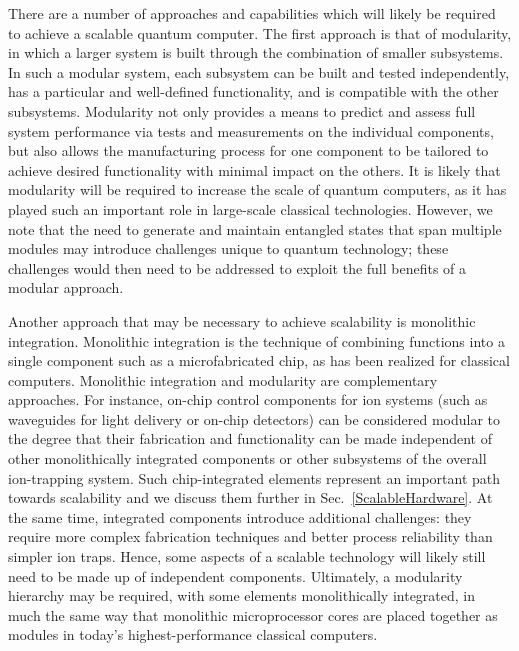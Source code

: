 \documentclass[%
12pt,
 amsmath,amssymb,
]{revtex4-2}
\begin{document}
There are a number of approaches and capabilities which will likely be required to achieve a scalable quantum computer.  The first approach is that of modularity, in which a larger system is built through the combination of smaller subsystems.  In such a modular system, each subsystem can be built and tested independently, has a particular and well-defined functionality, and is compatible with the other subsystems. Modularity not only provides a means to predict and assess full system performance via tests and measurements on the individual components, but also allows the manufacturing process for one component to be tailored to achieve desired functionality with minimal impact on the others.  It is likely that modularity will be required to increase the scale of quantum computers, as it has played such an important role in large-scale classical technologies.  However, we note that the need to generate and maintain entangled states that span multiple modules may introduce challenges unique to quantum technology; these challenges would then need to be addressed to exploit the full benefits of a modular approach.

Another approach that may be necessary to achieve scalability is monolithic integration.  Monolithic integration is the technique of combining functions into a single component such as a microfabricated chip, as has been realized for classical computers.  Monolithic integration and modularity are complementary approaches.  For instance, on-chip control components for ion systems (such as waveguides for light delivery or on-chip detectors) can be considered modular to the degree that their fabrication and functionality can be made independent of other monolithically integrated components or other subsystems of the overall ion-trapping system. Such chip-integrated elements represent an important path towards scalability and we discuss them further in Sec.~\ref{ScalableHardware}. At the same time, integrated components introduce additional challenges: they require more complex fabrication techniques and better process reliability than simpler ion traps. Hence, some aspects of a scalable technology will likely still need to be made up of independent components. Ultimately, a modularity hierarchy may be required, with some elements monolithically integrated, in much the same way that monolithic microprocessor cores are placed together as modules in today's highest-performance classical computers.
\end{document}
